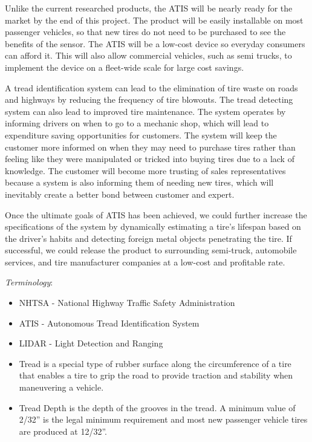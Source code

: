 \documentclass[11pt]{IEEEtran}
\begin{document}
			Unlike the current researched products, the ATIS will be nearly ready for the market by the end of this project. The product will be easily installable on most passenger vehicles, so that new tires do not need to be purchased to see the benefits of the sensor. The ATIS will be a low-cost device so everyday consumers can afford it. This will also allow commercial vehicles, such as semi trucks, to implement the device on a fleet-wide scale for large cost savings.

			A tread identification system can lead to the elimination of tire waste on roads and highways by reducing the frequency of tire blowouts. The tread detecting system can also lead to improved tire maintenance. The system operates by informing drivers on when to go to a mechanic shop, which will lead to expenditure saving opportunities for customers. The system will keep the customer more informed on when they may need to purchase tires rather than feeling like they were manipulated or tricked into buying tires due to a lack of knowledge. The customer will become more trusting of sales representatives because a system is also informing them of needing new tires, which will inevitably create a better bond between customer and expert. 

			Once the ultimate goals of ATIS has been achieved, we could further increase the specifications of the system by dynamically estimating a tire’s lifespan based on the driver’s habits and detecting foreign metal objects penetrating the tire. If successful, we could release the product to surrounding semi-truck, automobile services, and tire manufacturer companies at a low-cost and profitable rate.

		\textit{Terminology}:
		\begin{itemize}
			\item NHTSA - National Highway Traffic Safety Administration
			\item ATIS - Autonomous Tread Identification System
			\item LIDAR - Light Detection and Ranging 
			\item Tread is a special type of rubber surface along the circumference of a tire that enables a tire to grip the road to provide traction and stability when maneuvering a vehicle.
			\item Tread Depth is the depth of the grooves in the tread. A minimum value of 2/32'' is the legal minimum requirement and most new passenger vehicle tires are produced at 12/32''.
		\end{itemize}
\end{document}
